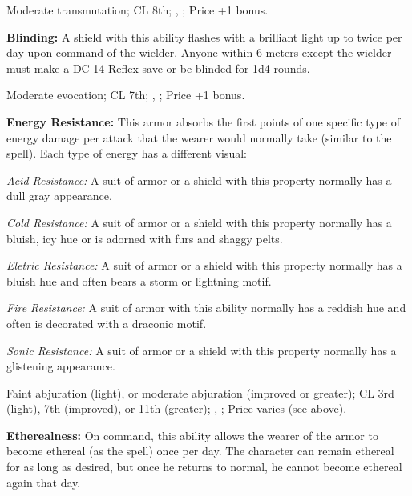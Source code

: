Moderate transmutation; CL 8th; , ; Price +1 bonus.

\textbf{Blinding:} A shield with this ability flashes with a brilliant light up to twice per day upon command of the wielder. Anyone within 6 meters except the wielder must make a DC 14 Reflex save or be blinded for 1d4 rounds.

Moderate evocation; CL 7th; , ; Price +1 bonus. 

\textbf{Energy Resistance:} This armor absorbs the first points of one specific type of energy damage per attack that the wearer would normally take (similar to the  spell). Each type of energy has a different visual:

\textit{Acid Resistance:} A suit of armor or a shield with this property normally has a dull gray appearance.

\textit{Cold Resistance:} A suit of armor or a shield with this property normally has a bluish, icy hue or is adorned with furs and shaggy pelts.

\textit{Eletric Resistance:} A suit of armor or a shield with this property normally has a bluish hue and often bears a storm or lightning motif.

\textit{Fire Resistance:} A suit of armor with this ability normally has a reddish hue and often is decorated with a draconic motif.

\textit{Sonic Resistance:} A suit of armor or a shield with this property normally has a glistening appearance.


Faint abjuration (light), or moderate abjuration (improved or greater); CL 3rd (light), 7th (improved), or 11th (greater); , ; Price varies (see above).

\textbf{Etherealness:} On command, this ability allows the wearer of the armor to become ethereal (as the  spell) once per day. The character can remain ethereal for as long as desired, but once he returns to normal, he cannot become ethereal again that day.

